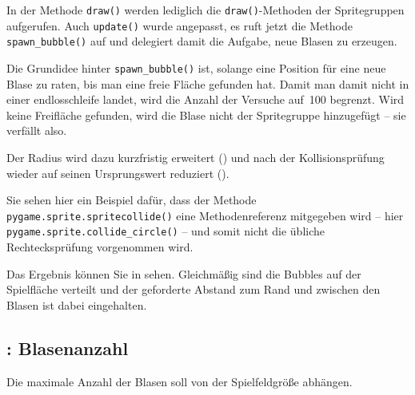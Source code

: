 
In der Methode \texttt{draw()} werden lediglich die \texttt{draw()}-Methoden der Spritegruppen aufgerufen. Auch \texttt{update()} wurde angepasst, es ruft jetzt die Methode \texttt{spawn\_bubble()} auf und delegiert damit die Aufgabe, neue Blasen zu erzeugen.


Die Grundidee hinter \texttt{spawn\_bubble()} ist, solange eine Position für eine neue Blase zu raten, bis man eine freie Fläche gefunden hat. Damit man damit nicht in einer \Gls{endlosschleife} landet, wird die Anzahl der Versuche auf~100 begrenzt. Wird keine Freifläche gefunden, wird die Blase nicht der Spritegruppe hinzugefügt -- sie verfällt also. 

Der Radius wird dazu kurzfristig erweitert () und nach der Kollisionsprüfung wieder auf seinen Ursprungswert reduziert (). 

Sie sehen hier ein Beispiel dafür, dass der Methode \texttt{pygame.sprite.spritecollide()} eine Methodenreferenz mitgegeben wird -- hier \texttt{pygame.sprite.collide\_circle()} --  und somit nicht die übliche Rechtecksprüfung vorgenommen wird.


Das Ergebnis können Sie in  sehen. Gleichmäßig sind die Bubbles auf der Spielfläche verteilt und der geforderte Abstand zum Rand und zwischen den Blasen ist dabei eingehalten.



\subsection{: Blasenanzahl}
	Die maximale Anzahl der Blasen soll von der Spielfeldgröße abhängen.
\er

